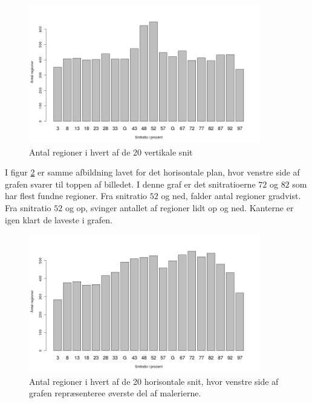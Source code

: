 {\begin{figure}[h!]
	\begin{center}
		\includegraphics[width=0.9\textwidth]{afsnit/resultater/billeder/cut0cut1eatsperratioU.png}
	\end{center}
	\caption{Antal regioner i hvert af de 20 vertikale snit}
	\label{antal_regioner_vertikale_cut_udvidet}
\end{figure}

I figur \ref{antal_regioner_horisontale_cut_udvidet} er samme afbildning
lavet for det horisontale plan, hvor venstre side af grafen svarer til
toppen af billedet. I denne graf er det snitratioerne $72$ og $82$ som
har flest fundne regioner. Fra snitratio $52$ og ned, falder antal
regioner gradvist. Fra snitratio $52$ og op, svinger antallet af
regioner lidt op og ned. Kanterne er igen klart de laveste i grafen.

\begin{figure}[h!]
	\begin{center}
		\includegraphics[width=0.9\textwidth]{afsnit/resultater/billeder/cut2cut3eatsperratioU.png}
	\end{center}
    \caption{Antal regioner i hvert af de 20 horisontale snit, hvor
    venstre side af grafen repræsenteree øverste del af malerierne.}
    \label{antal_regioner_horisontale_cut_udvidet}
\end{figure}

}
